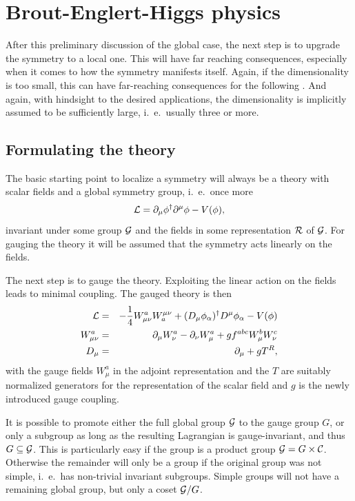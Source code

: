 \documentclass[final,12pt,3p,longtitle]{elsarticle}
\newcommand*{\La}{{\cal{L}}}
\newcommand*{\no}{\noindent}
\newcommand*{\bea}{\begin{eqnarray}}
\newcommand*{\eea}{\end{eqnarray}}
\newcommand*{\be}{\begin{equation}}
\newcommand*{\ee}{\end{equation}}
\newcommand*{\pd}{\partial}
\newcommand*{\pdm}{\pd_{\mu}}
\newcommand*{\pdn}{\pd_{\nu}}
\newcommand*{\mn}{{\mu\nu}}
\newcommand*{\nn}{\nonumber}
\newcommand*{\1}{1\!\!\!\bot}
\begin{document}
\section{Brout-Englert-Higgs physics}\label{s:beh}

After this preliminary discussion of the global case, the next step is to upgrade the symmetry to a local one. This will have far reaching consequences, especially when it comes to how the symmetry manifests itself. Again, if the dimensionality is too small, this can have far-reaching consequences for the following \cite{Kennedy:1985yn,Kennedy:1986ut}. And again, with hindsight to the desired applications, the dimensionality is implicitly assumed to be sufficiently large, i.\ e.\ usually three or more.

\subsection{Formulating the theory}\label{s:local}

The basic starting point to localize a symmetry will always be a theory with scalar fields and a global symmetry group, i.\ e.\ once more
\be
\La=\pdm\phi^\dagger\pd^\mu\phi-V(\phi)\nn,
\ee
\no invariant under some group ${\cal G}$ and the fields in some representation ${\cal R}$ of ${\cal G}$. For gauging the theory it will be assumed that the symmetry acts linearly on the fields.

The next step is to gauge the theory. Exploiting the linear action on the fields leads to minimal coupling. The gauged theory is then
\bea
{\La}&=&-\frac{1}{4}W_\mn^aW^\mn_a+(D_\mu\phi_\alpha)^\dagger D^\mu\phi_\alpha-V(\phi)\label{la:hs}\\
W_\mn^a&=&\pdm W_\nu^a-\pdn W_\mu^a+gf^{abc}W_\mu^b W_\nu^c\nn\\
D_\mu&=&\pdm+gT^R\nn,
\eea
\no with the gauge fields $W_\mu^a$ in the adjoint representation and the $T$ are suitably normalized generators for the representation of the scalar field and $g$ is the newly introduced gauge coupling.

It is possible to promote either the full global group ${\cal G}$ to the gauge group $G$, or only a subgroup as long as the resulting Lagrangian is gauge-invariant, and thus $G\subseteq{\cal G}$. This is particularly easy if the group is a product group ${\cal G}=G\times{\cal C}$. Otherwise the remainder will only be a group if the original group was not simple, i.\ e.\ has non-trivial invariant subgroups. Simple groups will not have a remaining global group, but only a coset ${\cal G}/G$.
\end{document}
